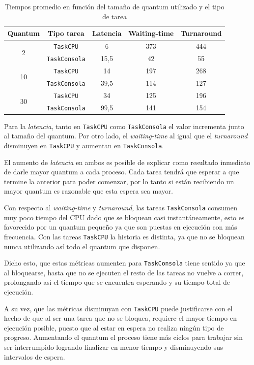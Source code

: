 \begin{table}[H]
	\begin{center}
		\begin{tabular}{|c|c|c|c|c|}
			\hline
			\textbf{Quantum} & \textbf{Tipo tarea} & \textbf{Latencia} & \textbf{Waiting-time} & \textbf{Turnaround} \\ \hline
			\multirow{2}{*}{2} & \texttt{TaskCPU} & 6 & 373 & 444 \\ \cline{2-5}
			& \texttt{TaskConsola} & 15,5 & 42 & 55 \\ \hline \hline
			\multirow{2}{*}{10} & \texttt{TaskCPU} & 14 & 197 & 268 \\ \cline{2-5}
			& \texttt{TaskConsola} & 39,5 & 114 & 127 \\ \hline \hline
			\multirow{2}{*}{30} & \texttt{TaskCPU} & 34 & 125 & 196 \\ \cline{2-5}
			& \texttt{TaskConsola} & 99,5 & 141 & 154 \\ \hline
		\end{tabular}
		\caption{Tiempos promedio en función del tamaño de quantum utilizado y
		el tipo de tarea}
	\end{center}
\end{table}

Para la \emph{latencia}, tanto en \texttt{TaskCPU} como \texttt{TaskConsola} el
valor incrementa junto al tamaño del quantum. Por otro lado, el
\emph{waiting-time} al igual que el \emph{turnaround} disminuyen en
\texttt{TaskCPU} y aumentan en \texttt{TaskConsola}.

El aumento de \emph{latencia} en ambos es posible de explicar como resultado
inmediato de darle mayor quantum a cada proceso. Cada tarea tendrá que esperar
a que termine la anterior para poder comenzar, por lo tanto si están
recibiendo un mayor quantum es razonable que esta espera sea mayor.

Con respecto al \emph{waiting-time} y \emph{turnaround}, las tareas
\texttt{TaskConsola} consumen muy poco tiempo del CPU dado que se bloquean casi
instantáneamente, esto es favorecido por un quantum pequeño ya que son puestas
en ejecución con más frecuencia. Con las tareas \texttt{TaskCPU} la historia es
distinta, ya que no se bloquean nunca utilizando así todo el quantum que
disponen.

Dicho esto, que estas métricas aumenten para \texttt{TaskConsola}
tiene sentido ya que al bloquearse, hasta que no se ejecuten el resto de las tareas no
vuelve a correr, prolongando así el tiempo que se encuentra esperando y su tiempo
total de ejecución.

A su vez, que las métricas disminuyan con \texttt{TaskCPU} puede justificarse
con el hecho de que al ser una tarea que no se bloquea, requiere el mayor tiempo
en ejecución posible, puesto que al estar en espera no realiza ningún tipo de
progreso. Aumentando el quantum el proceso tiene más ciclos para trabajar sin
ser interrumpido logrando finalizar en menor tiempo y disminuyendo sus
intervalos de espera.
